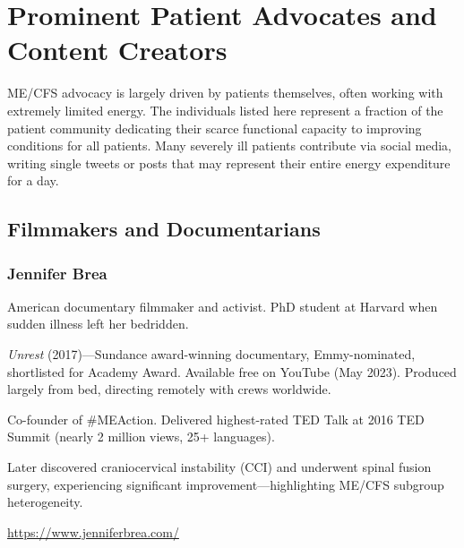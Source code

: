 \section{Prominent Patient Advocates and Content Creators}
\label{sec:patient-advocates}

\begin{observation}
ME/CFS advocacy is largely driven by patients themselves, often working with extremely limited energy. The individuals listed here represent a fraction of the patient community dedicating their scarce functional capacity to improving conditions for all patients. Many severely ill patients contribute via social media, writing single tweets or posts that may represent their entire energy expenditure for a day.
\end{observation}

\subsection{Filmmakers and Documentarians}

\subsubsection{Jennifer Brea}
\begin{description}[style=sameline]
\item[Background] American documentary filmmaker and activist. PhD student at Harvard when sudden illness left her bedridden.
\item[Key work] \textit{Unrest} (2017)---Sundance award-winning documentary, Emmy-nominated, shortlisted for Academy Award. Available free on YouTube (May 2023). Produced largely from bed, directing remotely with crews worldwide.
\item[Advocacy] Co-founder of \#MEAction. Delivered highest-rated TED Talk at 2016 TED Summit (nearly 2 million views, 25+ languages).
\item[Personal journey] Later discovered craniocervical instability (CCI) and underwent spinal fusion surgery, experiencing significant improvement---highlighting ME/CFS subgroup heterogeneity.
\item[Website] \url{https://www.jenniferbrea.com/}
\end{description}


